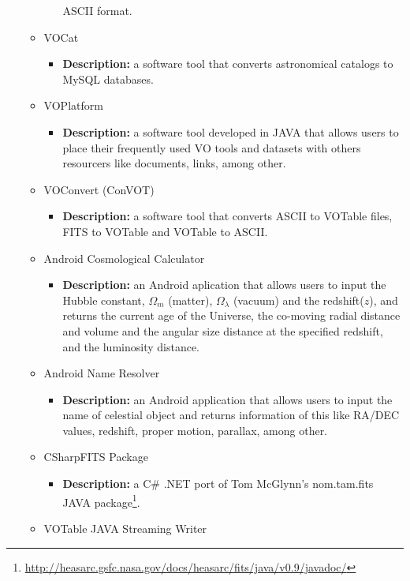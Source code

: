 \begin{itemize}
\begin{itemize}
\begin{itemize}
ASCII format.
\end{itemize}
\item VOCat
\begin{itemize}
\item \textbf{Description:} a software tool that converts astronomical catalogs
to MySQL databases. 
\end{itemize}
\item VOPlatform
\begin{itemize}
\item \textbf{Description:} a software tool developed in JAVA that allows users
to place their frequently used VO tools and datasets with others resourcers like
documents, links, among other.
\end{itemize}
\item VOConvert (ConVOT)
\begin{itemize}
\item \textbf{Description:} a software tool that converts ASCII to VOTable
files, FITS to VOTable and VOTable to ASCII.
\end{itemize}
\item Android Cosmological Calculator
\begin{itemize}
\item \textbf{Description:} an Android aplication that allows users to input the
Hubble constant, $ \Omega_{m} $ (matter), $ \Omega_{\lambda} $ (vacuum) and the
redshift($ z $), and returns the current age of the Universe, the co-moving
radial distance and volume and the angular size distance at the specified
redshift, and the luminosity distance.
\end{itemize}
\item Android Name Resolver
\begin{itemize}
\item \textbf{Description:} an Android application that allows users to input
the name of celestial object and returns information of this like RA/DEC values,
redshift, proper motion, parallax, among other.
\end{itemize}
\item CSharpFITS Package
\begin{itemize}
\item \textbf{Description:} a C\# .NET port of Tom McGlynn's nom.tam.fits JAVA
package\footnote{\url{http://heasarc.gsfc.nasa.gov/docs/heasarc/fits/java/v0.9/javadoc/}}.
\end{itemize}
\item VOTable JAVA Streaming Writer
\begin{itemize}

\end{itemize}
\end{itemize}
\end{itemize}
